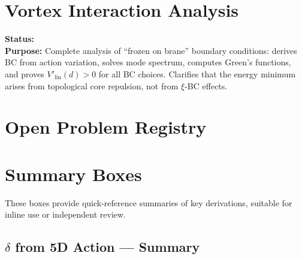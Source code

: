 

\section*{Vortex Interaction Analysis}

\label{sec:DL-bc-sign-analysis}
\textbf{Status:} \tagDer{} \\
\textbf{Purpose:} Complete analysis of ``frozen on brane'' boundary conditions:
derives BC from action variation, solves mode spectrum, computes Green's functions,
and proves $V'_{\mathrm{lin}}(d) > 0$ for all BC choices. Clarifies that the energy
minimum arises from topological core repulsion, not from $\xi$-BC effects.



\section*{Open Problem Registry}
\label{sec:DL-opr-registry}



\section*{Summary Boxes}

These boxes provide quick-reference summaries of key derivations, suitable
for inline use or independent review.

\subsection*{$\delta$ from 5D Action --- Summary}


